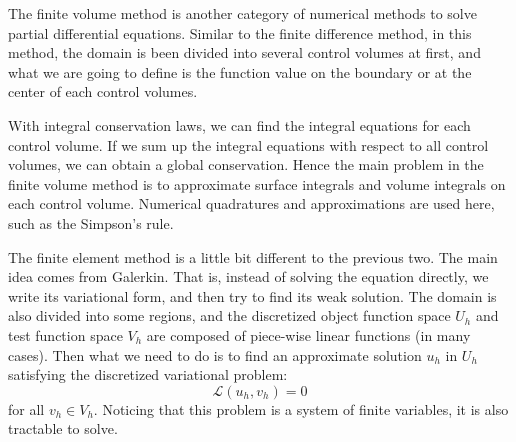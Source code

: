 \documentclass[english, nochinese]{pkupaper}
\begin{document}
The finite volume method is another category of numerical methods to solve partial differential equations. Similar to the finite difference method, in this method, the domain is been divided into several control volumes at first, and what we are going to define is the function value on the boundary or at the center of each control volumes.

With integral conservation laws, we can find the integral equations for each control volume. If we sum up the integral equations with respect to all control volumes, we can obtain a global conservation. Hence the main problem in the finite volume method is to approximate surface integrals and volume integrals on each control volume. Numerical quadratures and approximations are used here, such as the Simpson's rule.


The finite element method is a little bit different to the previous two. The main idea comes from Galerkin. That is, instead of solving the equation directly, we write its variational form, and then try to find its weak solution. The domain is also divided into some regions, and the discretized object function space $U_h$ and test function space $V_h$ are composed of piece-wise linear functions (in many cases). Then what we need to do is to find an approximate solution $u_h$ in $U_h$ satisfying the discretized variational problem:
\begin{equation}
\mathcal{L}(u_h, v_h) = 0
\end{equation}
for all $ v_h \in V_h $. Noticing that this problem is a system of finite variables, it is also tractable to solve.
\end{document}
